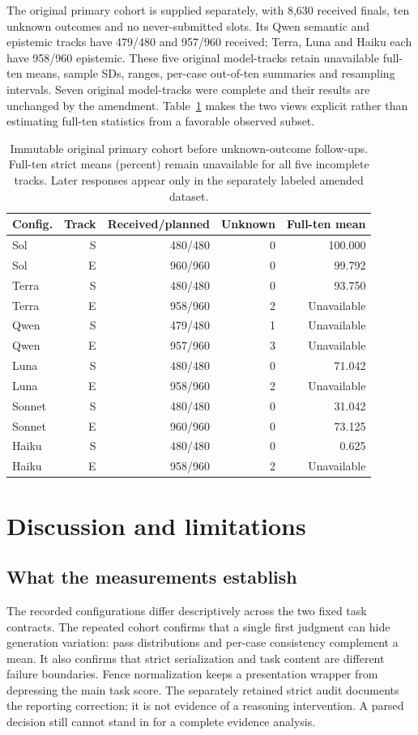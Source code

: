 \documentclass[a4paper,preprint,12pt,numbers,nopreprintline]{elsarticle}
\begin{document}
The original primary cohort is supplied separately, with 8,630 received finals, ten unknown outcomes and no never-submitted slots. Its Qwen semantic and epistemic tracks have 479/480 and 957/960 received; Terra, Luna and Haiku each have 958/960 epistemic. These five original model-tracks retain unavailable full-ten means, sample SDs, ranges, per-case out-of-ten summaries and resampling intervals. Seven original model-tracks were complete and their results are unchanged by the amendment. Table~\ref{tab:original-primary} makes the two views explicit rather than estimating full-ten statistics from a favorable observed subset.
\begin{table}[htbp]\centering\scriptsize
\caption{Immutable original primary cohort before unknown-outcome follow-ups. Full-ten strict means (percent) remain unavailable for all five incomplete tracks. Later responses appear only in the separately labeled amended dataset.}\label{tab:original-primary}
\setlength{\tabcolsep}{3pt}
\begin{tabular}{lrrrr}\toprule
Config. & Track & Received/planned & Unknown & Full-ten mean\\\midrule
Sol & S & 480/480 & 0 & 100.000\\
Sol & E & 960/960 & 0 & 99.792\\
Terra & S & 480/480 & 0 & 93.750\\
Terra & E & 958/960 & 2 & Unavailable\\
Qwen & S & 479/480 & 1 & Unavailable\\
Qwen & E & 957/960 & 3 & Unavailable\\
Luna & S & 480/480 & 0 & 71.042\\
Luna & E & 958/960 & 2 & Unavailable\\
Sonnet & S & 480/480 & 0 & 31.042\\
Sonnet & E & 960/960 & 0 & 73.125\\
Haiku & S & 480/480 & 0 & 0.625\\
Haiku & E & 958/960 & 2 & Unavailable\\
\bottomrule\end{tabular}
\end{table}

\section{Discussion and limitations}
\subsection{What the measurements establish}
The recorded configurations differ descriptively across the two fixed task contracts. The repeated cohort confirms that a single first judgment can hide generation variation: pass distributions and per-case consistency complement a mean. It also confirms that strict serialization and task content are different failure boundaries. Fence normalization keeps a presentation wrapper from depressing the main task score. The separately retained strict audit documents the reporting correction; it is not evidence of a reasoning intervention. A parsed decision still cannot stand in for a complete evidence analysis.
\end{document}
